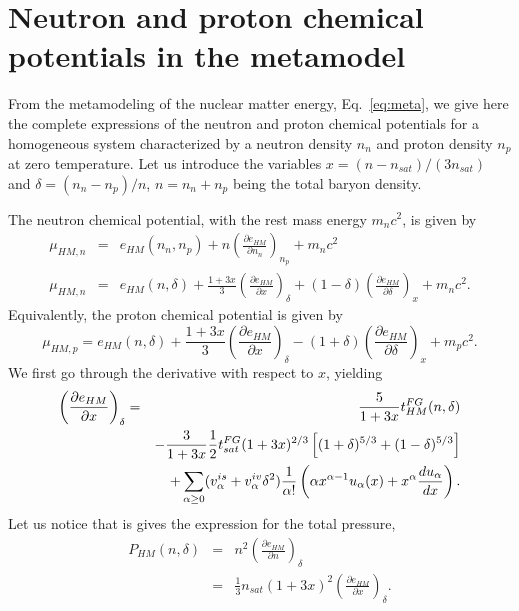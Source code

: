 \chapter{Neutron and proton chemical potentials in the metamodel}\label{appendix:mutau}

From the metamodeling of the nuclear matter energy, Eq.~\ref{eq:meta}, we give 
here the complete expressions of the neutron and proton chemical potentials
for a homogeneous system characterized by a neutron density $n_n$ and proton
density $n_p$ at zero temperature. Let us introduce the variables 
$x=(n-n_{sat})/(3n_{sat})$ and $\delta = (n_n - n_p)/n$, $n=n_n+n_p$ being the
total baryon density.

The neutron chemical potential, with the rest mass energy $m_nc^2$, is given by
%
\begin{eqnarray}
  \mu_{HM,n} &=& e_{HM}(n_n,n_p) + n\left(\frac{\partial
  e_{HM}}{\partial n_n}\right)_{n_p} + m_nc^2\\
  \mu_{HM,n} &=& e_{HM}(n,\delta) + \frac{1+3x}{3}\left(\frac{\partial
  e_{HM}}{\partial x}\right)_\delta + (1 - \delta)\left(\frac{\partial
e_{HM}}{\partial \delta}\right)_x + m_n c^2.
\end{eqnarray}
%
Equivalently, the proton chemical potential is given by
%
\begin{equation}
  \mu_{HM,p} = e_{HM}(n,\delta) + \frac{1+3x}{3}\left(\frac{\partial
  e_{HM}}{\partial x}\right)_\delta - (1 + \delta)\left(\frac{\partial
e_{HM}}{\partial \delta}\right)_x + m_p c^2.
\end{equation}
%
We first go through the derivative with respect to $x$, yielding
%
\begin{eqnarray}
  \left(\frac{\partial e_{HM}}{\partial x}\right)_\delta &=&  
  \frac{5}{1+3x}t_{HM}^{FG}(n,\delta) \notag\\
                                                         &&-
  \frac{3}{1+3x}\frac{1}{2}t_{sat}^{FG}(1+3x)^{2/3}
  \left[(1+\delta)^{5/3}+(1-\delta)^{5/3}\right]\notag\\
                                                         &&+
  \sum_{\alpha \geq 0}
  (v_\alpha^{is} + v_\alpha^{iv}\delta^2)\frac{1}{\alpha!}\left(\alpha
  x^{\alpha-1}u_\alpha(x) + x^\alpha \frac{du_\alpha}{dx}\right).
\end{eqnarray}
%
Let us notice that is gives the expression for the total pressure,
%
\begin{eqnarray}
  P_{HM}(n,\delta) &=& n^2\left(\frac{\partial e_{HM}}{\partial
  n}\right)_\delta\\
  &=& \frac{1}{3}n_{sat}(1+3x)^2\left(\frac{\partial e_{HM}}{\partial
  x}\right)_\delta.
\end{eqnarray}
